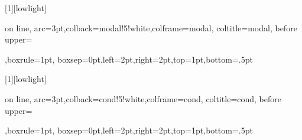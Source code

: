 	\newtcbox{\mhl}[1][lowlight]{on line,
	arc=3pt,colback=modal!5!white,colframe=modal,
	coltitle=modal,
	before upper={\rule[-3pt]{0pt}{10pt}},boxrule=1pt,
	boxsep=0pt,left=2pt,right=2pt,top=1pt,bottom=.5pt}

	\newtcbox{\chl}[1][lowlight]{on line,
	arc=3pt,colback=cond!5!white,colframe=cond,
	coltitle=cond,
	before upper={\rule[-3pt]{0pt}{10pt}},boxrule=1pt,
	boxsep=0pt,left=2pt,right=2pt,top=1pt,bottom=.5pt}


	\usepackage{linguex}
	\usepackage{booktabs}
	\usepackage[round]{natbib}
	\usepackage{multirow}
	\usepackage{rotating}


	\usepackage{tikz}

	\usepackage{pifont}%
	\newcommand{\cmark}{\ding{51}}%
	\newcommand{\xmark}{\ding{55}}%


